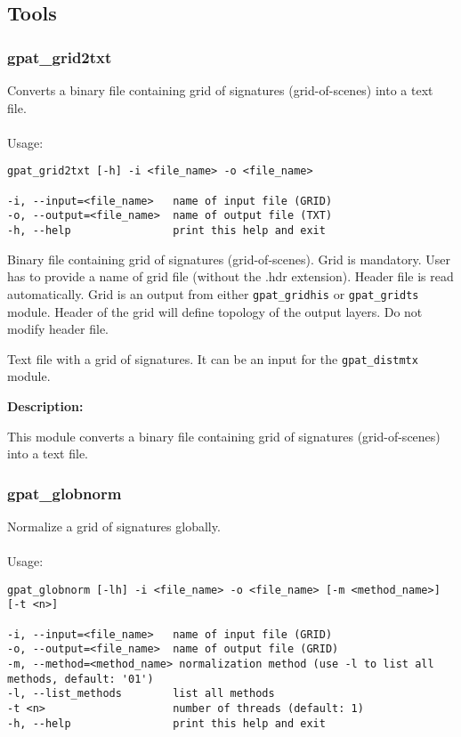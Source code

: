 \subsection{Tools}
\subsubsection{gpat\_grid2txt}
Converts a binary file containing grid of signatures (grid-of-scenes) into a text file.
\\\\
Usage:

\begin{minipage}{\linewidth}
\begin{lstlisting}
gpat_grid2txt [-h] -i <file_name> -o <file_name>

-i, --input=<file_name>   name of input file (GRID)
-o, --output=<file_name>  name of output file (TXT)
-h, --help                print this help and exit
\end{lstlisting}
\end{minipage}


Binary file containing grid of signatures (grid-of-scenes). 
Grid is mandatory. 
User has to provide a name of grid file (without the .hdr extension). 
Header file is read automatically. 
Grid is an output from either {\tt gpat\_gridhis} or {\tt gpat\_gridts} module. 
Header of the grid will define topology of the output layers. 
Do not modify header file.


Text file with a grid of signatures. 
It can be an input for the {\tt gpat\_distmtx} module.

{\bf Description:}

This module converts a binary file containing grid of signatures (grid-of-scenes) into a text file.

\subsubsection{gpat\_globnorm}
Normalize a grid of signatures globally. 
\\\\
Usage:

\begin{minipage}{\linewidth}
\begin{lstlisting}
gpat_globnorm [-lh] -i <file_name> -o <file_name> [-m <method_name>] [-t <n>]

-i, --input=<file_name>   name of input file (GRID)
-o, --output=<file_name>  name of output file (GRID)
-m, --method=<method_name> normalization method (use -l to list all methods, default: '01')
-l, --list_methods        list all methods
-t <n>                    number of threads (default: 1)
-h, --help                print this help and exit
\end{lstlisting}
\end{minipage}

